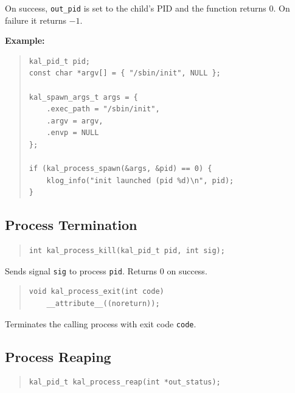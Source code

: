 \documentclass[11pt,twoside]{article}
\begin{document}
On success, {\tt *out\_pid} is set to the child's PID and the
function returns $0$.  On failure it returns $-1$.

\medskip
\noindent
{\bf Example:}
\begin{quote}
\begin{verbatim}
kal_pid_t pid;
const char *argv[] = { "/sbin/init", NULL };

kal_spawn_args_t args = {
    .exec_path = "/sbin/init",
    .argv = argv,
    .envp = NULL
};

if (kal_process_spawn(&args, &pid) == 0) {
    klog_info("init launched (pid %d)\n", pid);
}
\end{verbatim}
\end{quote}

\subsection{Process Termination}

\begin{quote}
\begin{verbatim}
int kal_process_kill(kal_pid_t pid, int sig);
\end{verbatim}
\end{quote}

Sends signal {\tt sig} to process {\tt pid}.  Returns $0$ on
success.

\begin{quote}
\begin{verbatim}
void kal_process_exit(int code)
    __attribute__((noreturn));
\end{verbatim}
\end{quote}

Terminates the calling process with exit code {\tt code}.

\subsection{Process Reaping}

\begin{quote}
\begin{verbatim}
kal_pid_t kal_process_reap(int *out_status);
\end{verbatim}
\end{quote}
\end{document}
